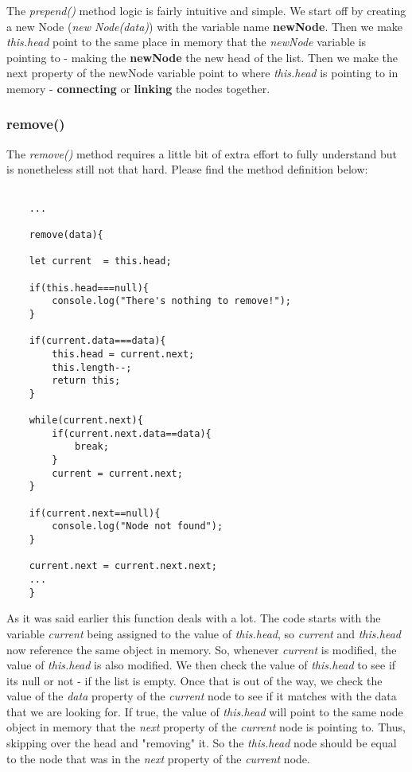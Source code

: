 \documentclass{article}
\begin{document}
The \textit{prepend()} method logic is fairly intuitive and simple. We start off by creating a new Node (\textit{new Node(data)})  with the variable name \textbf{newNode}. Then we make \textit{this.head }point to the same place in memory that the \textit{newNode}
variable is pointing to - making the \textbf{newNode} the new head of the list. Then we make the next property of the newNode variable point to where \textit{this.head} is pointing to in memory - \textbf{connecting} or \textbf{linking} the nodes together.


\newpage
\subsubsection{remove()}

The \textit{remove()} method requires a little bit of extra effort to fully understand but is nonetheless still not that hard. Please find the method definition below:

\begin{verbatim}
    
    ...

    remove(data){

    let current  = this.head;

    if(this.head===null){
        console.log("There's nothing to remove!");
    }

    if(current.data===data){
        this.head = current.next;
        this.length--;
        return this;
    }

    while(current.next){
        if(current.next.data==data){
            break;
        }
        current = current.next;
    }

    if(current.next==null){
        console.log("Node not found");
    }

    current.next = current.next.next;
    ...
    }

\end{verbatim}

As it was said earlier this function deals with a lot. The code starts with the variable \textit{current} being assigned to the value of \textit{this.head}, so \textit{current} and \textit{this.head} now reference the same object in memory. 
So, whenever \textit{current} is modified, the value of \textit{this.head} is also modified. We then check the value of \textit{this.head} to see if its null or not - if the list is empty. Once that is out of the way, we check the value of the \textit{data} property of the \textit{current} node to see if it matches with the data that we are looking for. 
If true, the value of \textit{this.head} will point to the same node object in memory that the \textit{next} property of the \textit{current} node is pointing to. Thus, skipping over the head and "removing" it. So the \textit{this.head }node should be equal to the node that was in the \textit{next} property of the \textit{current} node.\\
\end{document}
